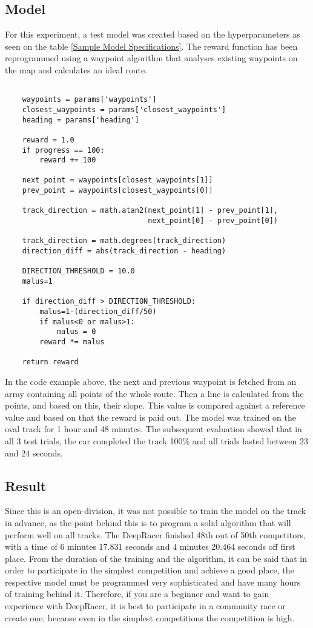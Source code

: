 \subsection{Model}
For this experiment, a test model was created based on the hyperparameters as seen on the table \ref{Sample Model Specifications}. The reward function has been reprogrammed using a waypoint algorithm that analyses existing waypoints on the map and calculates an ideal route. 
 \begin{listing}[H]
    \begin{verbatim}

    waypoints = params['waypoints']
    closest_waypoints = params['closest_waypoints']
    heading = params['heading']

    reward = 1.0
    if progress == 100:
        reward += 100

    next_point = waypoints[closest_waypoints[1]]
    prev_point = waypoints[closest_waypoints[0]]
    
    track_direction = math.atan2(next_point[1] - prev_point[1], 
                                 next_point[0] - prev_point[0]) 
   
    track_direction = math.degrees(track_direction)
    direction_diff = abs(track_direction - heading)
    
    DIRECTION_THRESHOLD = 10.0
    malus=1

    if direction_diff > DIRECTION_THRESHOLD:
        malus=1-(direction_diff/50)
        if malus<0 or malus>1:
            malus = 0
        reward *= malus

    return reward
    \end{verbatim}
\end{listing}
In the code example above, the next and previous waypoint is fetched from an array containing all points of the whole route. Then a line is calculated from the points, and based on this, their slope. This value is compared against a reference value and based on that the reward is paid out. The model was trained on the oval track for 1 hour and 48 minutes. The subsequent evaluation showed that in all 3 test trials, the car completed the track 100\% and all trials lasted between 23 and 24 seconds.

\subsection{Result}
Since this is an open-division, it was not possible to train the model on the track in advance, as the point behind this is to program a solid algorithm that will perform well on all tracks. The DeepRacer finished 48th out of 50th competitors, with a time of 6 minutes 17.831 seconds and 4 minutes 20.464 seconds off first place.  From the duration of the training and the algorithm, it can be said that in order to participate in the simplest competition and achieve a good place, the respective model must be programmed very sophisticated and have many hours of training behind it.  Therefore, if you are a beginner and want to gain experience with DeepRacer, it is best to participate in a community race or create one, because even in the simplest competitions the competition is high.